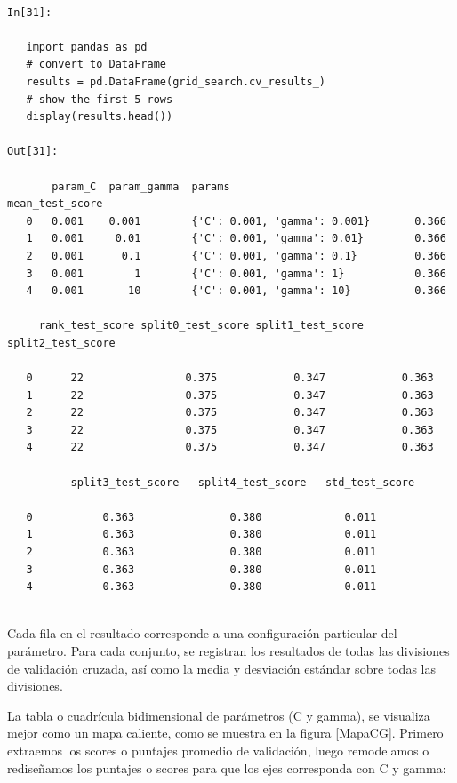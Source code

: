 \begin{lstlisting}

In[31]:

   import pandas as pd
   # convert to DataFrame
   results = pd.DataFrame(grid_search.cv_results_)
   # show the first 5 rows
   display(results.head())

Out[31]:

       param_C  param_gamma  params                        mean_test_score
   0   0.001    0.001        {'C': 0.001, 'gamma': 0.001}       0.366
   1   0.001     0.01        {'C': 0.001, 'gamma': 0.01}        0.366
   2   0.001      0.1        {'C': 0.001, 'gamma': 0.1}         0.366
   3   0.001        1        {'C': 0.001, 'gamma': 1}           0.366
   4   0.001       10        {'C': 0.001, 'gamma': 10}          0.366

     rank_test_score split0_test_score split1_test_score split2_test_score
           
   0      22                0.375            0.347            0.363
   1      22                0.375            0.347            0.363
   2      22                0.375            0.347            0.363
   3      22                0.375            0.347            0.363
   4      22                0.375            0.347            0.363
           
          split3_test_score   split4_test_score   std_test_score
           
   0           0.363               0.380             0.011
   1           0.363               0.380             0.011
   2           0.363               0.380             0.011
   3           0.363               0.380             0.011
   4           0.363               0.380             0.011
    
\end{lstlisting}



Cada fila en el resultado corresponde a una configuración  particular del parámetro. Para 
cada conjunto, se registran los resultados de todas las divisiones de validación cruzada, así 
como la media y desviación estándar sobre todas las divisiones. 

La tabla o cuadrícula bidimensional de parámetros (C y gamma),  se visualiza mejor como un mapa
caliente, como se muestra en la figura \ref{MapaCG}.  Primero  extraemos los scores o puntajes
 promedio  de validación, luego  remodelamos o rediseñamos los puntajes o scores  para que los 
 ejes  corresponda con   C  y   gamma:


